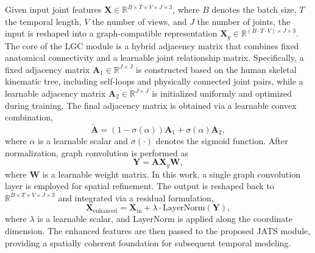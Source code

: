 \documentclass[conference]{IEEEtran}
\begin{document}
Given input joint features $\mathbf{X} \in \mathbb{R}^{B \times T \times V \times J \times 3}$, where $B$ denotes the batch size, $T$ the temporal length, $V$ the number of views, and $J$ the number of joints, the input is reshaped into a graph-compatible representation $\mathbf{X}_g \in \mathbb{R}^{(B \cdot T \cdot V) \times J \times 3}$. The core of the LGC module is a hybrid adjacency matrix that combines fixed anatomical connectivity and a learnable joint relationship matrix. Specifically, a fixed adjacency matrix $\mathbf{A}_1 \in \mathbb{R}^{J \times J}$ is constructed based on the human skeletal kinematic tree, including self-loops and physically connected joint pairs, while a learnable adjacency matrix $\mathbf{A}_2 \in \mathbb{R}^{J \times J}$ is initialized uniformly and optimized during training. The final adjacency matrix is obtained via a learnable convex combination,
\begin{equation}
\tilde{\mathbf{A}} = (1 - \sigma(\alpha)) \mathbf{A}_1 + \sigma(\alpha) \mathbf{A}_2,
\end{equation}
where $\alpha$ is a learnable scalar and $\sigma(\cdot)$ denotes the sigmoid function. After normalization, graph convolution is performed as
\begin{equation}
\mathbf{Y} = \mathbf{A} \mathbf{X}_g \mathbf{W},
\end{equation}
where $\mathbf{W}$ is a learnable weight matrix. In this work, a single graph convolution layer is employed for spatial refinement. The output is reshaped back to $\mathbb{R}^{B \times T \times V \times J \times 3}$ and integrated via a residual formulation,
\begin{equation}
\mathbf{X}_{\text{enhanced}} = \mathbf{X}_{\text{in}} + \lambda \cdot \text{LayerNorm}(\mathbf{Y}),
\end{equation}
where $\lambda$ is a learnable scalar, and LayerNorm is applied along the coordinate dimension. The enhanced features are then passed to the proposed JATS module, providing a spatially coherent foundation for subsequent temporal modeling.
\end{document}
